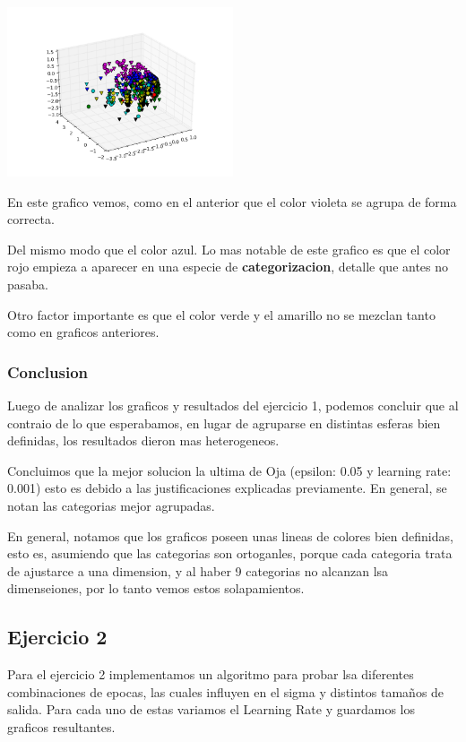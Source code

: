 \includegraphics[width=0.5\textwidth]{img/ej1_oja_005_240}

En este grafico vemos, como en el anterior que el color violeta se agrupa de forma correcta.

Del mismo modo que el color azul. Lo mas notable de este grafico es que el color rojo empieza a aparecer en una especie de \textbf{categorizacion}, detalle que antes no pasaba. 

Otro factor importante es que el color verde y el amarillo no se mezclan tanto como en graficos anteriores.

\subsubsection{Conclusion}

Luego de analizar los graficos y resultados del ejercicio 1, podemos concluir que al contraio de lo que esperabamos, en lugar de agruparse en distintas esferas bien definidas, los resultados dieron mas heterogeneos.

Concluimos que la mejor solucion la ultima de Oja (epsilon: 0.05 y learning rate: 0.001) esto es debido a las justificaciones explicadas previamente. En general, se notan las categorias mejor agrupadas.

En general, notamos que los graficos poseen unas lineas de colores bien definidas, esto es, asumiendo que las categorias son ortoganles, porque cada categoria trata de ajustarce a una dimension, y al haber 9 categorias no alcanzan lsa dimenseiones, por lo tanto vemos estos solapamientos.

\subsection{Ejercicio 2}

Para el ejercicio 2 implementamos un algoritmo para probar lsa diferentes combinaciones de epocas, las cuales influyen en el sigma y distintos tamaños de salida. Para cada uno de estas variamos el Learning Rate y guardamos los graficos resultantes.

